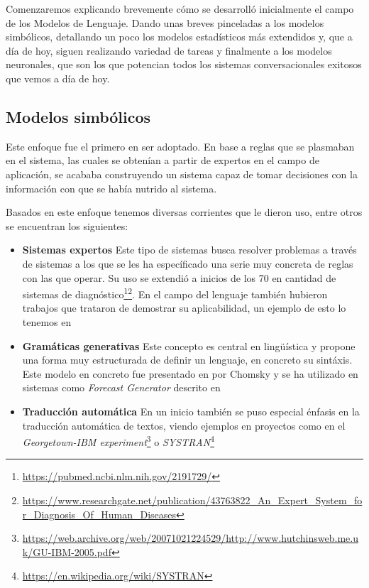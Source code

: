 Comenzaremos explicando brevemente cómo se desarrolló inicialmente el campo de los Modelos de Lenguaje. Dando unas breves pinceladas a los modelos simbólicos, detallando un poco los modelos estadísticos más extendidos y, que a día de hoy, siguen realizando variedad de tareas y finalmente a los modelos neuronales, que son los que potencian todos los sistemas conversacionales exitosos que vemos a día de hoy.

\subsection{Modelos simbólicos}

Este enfoque fue el primero en ser adoptado. En base a reglas que se plasmaban en el sistema, las cuales se obtenían a partir de expertos en el campo de aplicación, se acababa construyendo un sistema capaz de tomar decisiones con la información con que se había nutrido al sistema.

Basados en este enfoque tenemos diversas corrientes que le dieron uso, entre otros se encuentran los siguientes:

\begin{itemize}
	\item \textbf{Sistemas expertos} Este tipo de sistemas busca resolver problemas a través de sistemas a los que se les ha específicado una serie muy concreta de reglas con las que operar. Su uso se extendió a inicios de los 70 en cantidad de sistemas de diagnóstico\footnote{\url{https://pubmed.ncbi.nlm.nih.gov/2191729/}}\footnote{\url{https://www.researchgate.net/publication/43763822_An_Expert_System_for_Diagnosis_Of_Human_Diseases}}. En el campo del lenguaje también hubieron trabajos que trataron de demostrar su aplicabilidad, un ejemplo de esto lo tenemos en \cite{winograd1971procedures}
	\item \textbf{Gramáticas generativas} Este concepto es central en lingüística y propone una forma muy estructurada de definir un lenguaje, en concreto su sintáxis. Este modelo en concreto fue presentado en \cite{Chomsky+1957} por Chomsky y se ha utilizado en sistemas como \textit{Forecast Generator} descrito en \cite{goldberg1994using}
	\item \textbf{Traducción automática} En un inicio también se puso especial énfasis en la traducción automática de textos, viendo ejemplos en proyectos como en el \textit{Georgetown-IBM experiment}\footnote{\url{https://web.archive.org/web/20071021224529/http://www.hutchinsweb.me.uk/GU-IBM-2005.pdf}} o \textit{SYSTRAN}\footnote{\url{https://en.wikipedia.org/wiki/SYSTRAN}}
\end{itemize}

